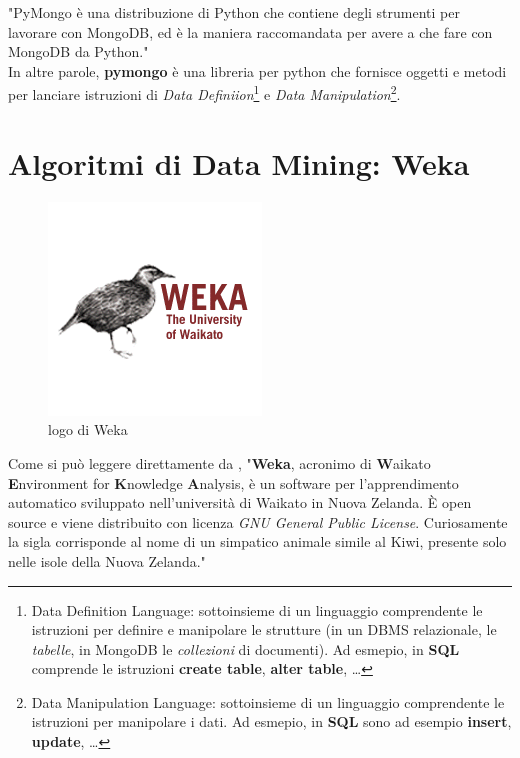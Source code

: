         "PyMongo è una distribuzione di Python che contiene degli strumenti per lavorare con MongoDB, ed è la maniera raccomandata per avere a che fare con MongoDB da Python." \\

        In altre parole, \textbf{pymongo} è una libreria per python che fornisce oggetti e metodi per lanciare istruzioni di \textit{Data Definiion}\footnote{Data Definition Language: sottoinsieme di un linguaggio comprendente le istruzioni per definire e manipolare le strutture (in un DBMS relazionale, le \textit{tabelle}, in MongoDB le \textit{collezioni} di documenti). Ad esmepio, in \textbf{SQL} comprende le istruzioni \textbf{create table}, \textbf{alter table}, \ldots} e \textit{Data Manipulation}\footnote{Data Manipulation Language: sottoinsieme di un linguaggio comprendente le istruzioni per manipolare i dati. Ad esmepio, in \textbf{SQL} sono ad esempio \textbf{insert}, \textbf{update}, \ldots}.

\section{Algoritmi di Data Mining: Weka}

        \begin{figure}
            \centering
            \caption{logo di Weka}
            \label{weka}
    	    \includegraphics[scale=0.75]{img/weka.png}
        \end{figure}

    Come si può leggere direttamente da \cite{wekawiki}, "\textbf{Weka}, acronimo di \textbf{W}aikato \textbf{E}nvironment for \textbf{K}nowledge \textbf{A}nalysis, è un software per l'apprendimento automatico sviluppato nell'università di Waikato in Nuova Zelanda. È open source e viene distribuito con licenza \textit{GNU General Public License}. Curiosamente la sigla corrisponde al nome di un simpatico animale simile al Kiwi, presente solo nelle isole della Nuova Zelanda." \\

